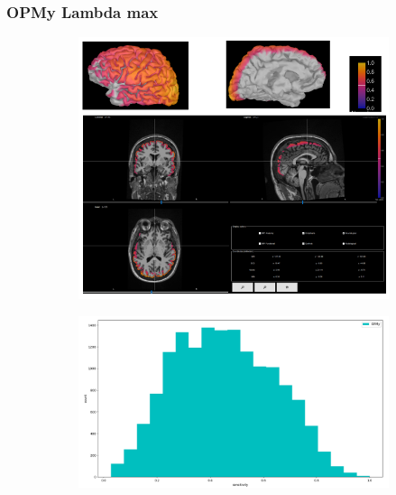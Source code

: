 \documentclass{beamer}
\numberwithin{figure}{section}
\numberwithin{equation}{section}
\begin{document}

\section{}
\begin{frame}
 \frametitle{OPMy Lambda max}
  

 	\begin{figure}[h]
        \begin{subfigure}[h]{0.53\linewidth} 
            \includegraphics[width=\linewidth]{pictures/OPMY1}
            \label{fig:rdf_graph}
        \end{subfigure}       
        \begin{subfigure}[h]{0.45\linewidth} 
            \includegraphics[width=\linewidth]{pictures/HISTopmy0}
            \label{fig:rdfs_graph}
        \end{subfigure}
    \end{figure}

  
\end{frame}
\end{document}
